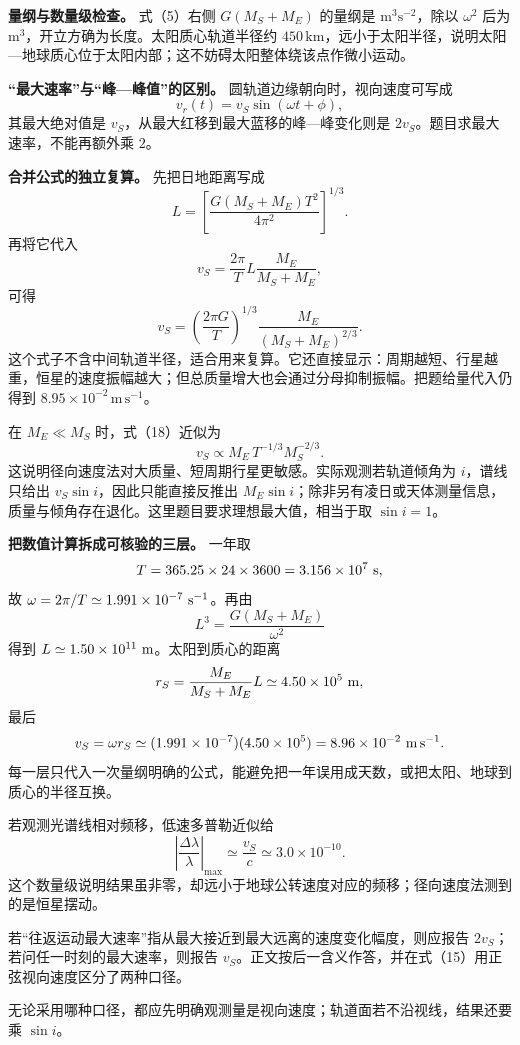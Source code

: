 \documentclass[12pt,a4paper,UTF8]{ctexart}
\begin{document}
\textbf{量纲与数量级检查。} 式（5）右侧 \(G(M_S+M_E)\) 的量纲是
\(\mathrm{m^3s^{-2}}\)，除以 \(\omega^2\) 后为
\(\mathrm{m^3}\)，开立方确为长度。太阳质心轨道半径约
\(450\,\mathrm{km}\)，远小于太阳半径，说明太阳---地球质心位于太阳内部；这不妨碍太阳整体绕该点作微小运动。

\textbf{``最大速率''与``峰---峰值''的区别。}
圆轨道边缘朝向时，视向速度可写成 \[
v_r(t)=v_S\sin(\omega t+\phi), \tag{15}
\] 其最大绝对值是 \(v_S\)，从最大红移到最大蓝移的峰---峰变化则是
\(2v_S\)。题目求最大速率，不能再额外乘 \(2\)。

\textbf{合并公式的独立复算。} 先把日地距离写成 \[
L=\left[\frac{G(M_S+M_E)T^2}{4\pi^2}\right]^{1/3}. \tag{16}
\] 再将它代入 \[
v_S=\frac{2\pi}{T}L\frac{M_E}{M_S+M_E}, \tag{17}
\] 可得 \[
v_S=\left(\frac{2\pi G}{T}\right)^{1/3}
\frac{M_E}{(M_S+M_E)^{2/3}}. \tag{18}
\]
这个式子不含中间轨道半径，适合用来复算。它还直接显示：周期越短、行星越重，恒星的速度振幅越大；但总质量增大也会通过分母抑制振幅。把题给量代入仍得到
\(8.95\times10^{-2}\,\mathrm{m\,s^{-1}}\)。

在 \(M_E\ll M_S\) 时，式（18）近似为 \[
v_S\propto M_E\,T^{-1/3}M_S^{-2/3}. \tag{19}
\] 这说明径向速度法对大质量、短周期行星更敏感。实际观测若轨道倾角为
\(i\)，谱线只给出 \(v_S\sin i\)，因此只能直接反推出
\(M_E\sin i\)；除非另有凌日或天体测量信息，质量与倾角存在退化。这里题目要求理想最大值，相当于取
\(\sin i=1\)。

\textbf{把数值计算拆成可核验的三层。} 一年取 \[
T=365.25\times24\times3600
=3.156\times10^7\ {\rm s},
\] 故 \(\omega=2\pi/T\simeq1.991\times10^{-7}\ {\rm s^{-1}}\)。再由 \[
L^3=\frac{G(M_S+M_E)}{\omega^2}
\] 得到 \(L\simeq1.50\times10^{11}\ {\rm m}\)。太阳到质心的距离 \[
r_S=\frac{M_E}{M_S+M_E}L
\simeq4.50\times10^5\ {\rm m},
\] 最后 \[
v_S=\omega r_S
\simeq(1.991\times10^{-7})(4.50\times10^5)
=8.96\times10^{-2}\ {\rm m\,s^{-1}}.
\]
每一层只代入一次量纲明确的公式，能避免把一年误用成天数，或把太阳、地球到质心的半径互换。

若观测光谱线相对频移，低速多普勒近似给 \[
\left|\frac{\Delta\lambda}{\lambda}\right|_{\max}
\simeq\frac{v_S}{c}
\simeq3.0\times10^{-10}.
\]
这个数量级说明结果虽非零，却远小于地球公转速度对应的频移；径向速度法测到的是恒星摆动。

若``往返运动最大速率''指从最大接近到最大远离的速度变化幅度，则应报告
\(2v_S\)；若问任一时刻的最大速率，则报告
\(v_S\)。正文按后一含义作答，并在式（15）用正弦视向速度区分了两种口径。

无论采用哪种口径，都应先明确观测量是视向速度；轨道面若不沿视线，结果还要乘
\(\sin i\)。
\end{document}
